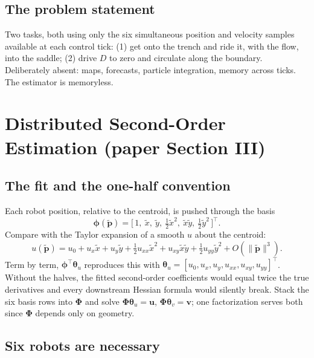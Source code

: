 \documentclass[11pt]{article}
\begin{document}
\subsection{The problem statement}

Two tasks, both using only the six simultaneous position and velocity
samples available at each control tick: (1) get onto the trench and ride it,
with the flow, into the saddle; (2) drive $D$ to zero and circulate along
the boundary. Deliberately absent: maps, forecasts, particle integration,
memory across ticks. The estimator is memoryless.

\section{Distributed Second-Order Estimation (paper Section III)}

\subsection{The fit and the one-half convention}

Each robot position, relative to the centroid, is pushed through the basis
\begin{equation}
\boldsymbol{\phi}(\tilde{\mathbf{p}})
= \bigl[\,1,\ \tilde{x},\ \tilde{y},\ \tfrac{1}{2}\tilde{x}^2,\
\tilde{x}\tilde{y},\ \tfrac{1}{2}\tilde{y}^2\,\bigr]^\top .
\end{equation}
Compare with the Taylor expansion of a smooth $u$ about the centroid:
\begin{equation}
u(\tilde{\mathbf{p}}) = u_0 + u_x\tilde{x} + u_y\tilde{y}
+ \tfrac{1}{2}u_{xx}\tilde{x}^2 + u_{xy}\tilde{x}\tilde{y}
+ \tfrac{1}{2}u_{yy}\tilde{y}^2 + O(\|\tilde{\mathbf{p}}\|^3).
\end{equation}
Term by term, $\boldsymbol{\phi}^\top\boldsymbol{\theta}_u$ reproduces this
with $\boldsymbol{\theta}_u = [u_0, u_x, u_y, u_{xx}, u_{xy}, u_{yy}]^\top$.
Without the halves, the fitted second-order coefficients would equal twice
the true derivatives and every downstream Hessian formula would silently
break. Stack the six basis rows into $\boldsymbol{\Phi}$ and solve
$\boldsymbol{\Phi}\boldsymbol{\theta}_u = \mathbf{u}$,
$\boldsymbol{\Phi}\boldsymbol{\theta}_v = \mathbf{v}$; one factorization
serves both since $\boldsymbol{\Phi}$ depends only on geometry.

\subsection{Six robots are necessary}
\end{document}
